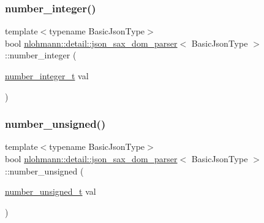 \mbox{\label{classnlohmann_1_1detail_1_1json__sax__dom__parser_aff77f861ba336df48c9786a993941397}} 
\subsubsection{\texorpdfstring{number\+\_\+integer()}{number\_integer()}}
{\footnotesize\ttfamily template$<$typename Basic\+Json\+Type$>$ \\
bool \hyperlink{classnlohmann_1_1detail_1_1json__sax__dom__parser}{nlohmann\+::detail\+::json\+\_\+sax\+\_\+dom\+\_\+parser}$<$ Basic\+Json\+Type $>$\+::number\+\_\+integer (\begin{DoxyParamCaption}\item[{\hyperlink{classnlohmann_1_1detail_1_1json__sax__dom__parser_a3d5cd67d179aa7422ce90e54984a441e}{number\+\_\+integer\+\_\+t}}]{val }\end{DoxyParamCaption})\hspace{0.3cm}{\ttfamily [inline]}}

\mbox{\label{classnlohmann_1_1detail_1_1json__sax__dom__parser_a2b4ff5146ed46993527e4a67d99c1355}} 
\subsubsection{\texorpdfstring{number\+\_\+unsigned()}{number\_unsigned()}}
{\footnotesize\ttfamily template$<$typename Basic\+Json\+Type$>$ \\
bool \hyperlink{classnlohmann_1_1detail_1_1json__sax__dom__parser}{nlohmann\+::detail\+::json\+\_\+sax\+\_\+dom\+\_\+parser}$<$ Basic\+Json\+Type $>$\+::number\+\_\+unsigned (\begin{DoxyParamCaption}\item[{\hyperlink{classnlohmann_1_1detail_1_1json__sax__dom__parser_a90f19b272530a479db81db11be2ea15c}{number\+\_\+unsigned\+\_\+t}}]{val }\end{DoxyParamCaption})\hspace{0.3cm}{\ttfamily [inline]}}

